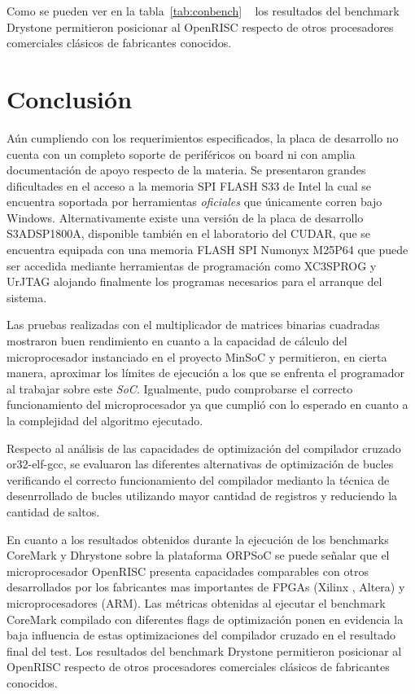 Como se pueden ver en la tabla~\ref{tab:conbench} ~\cite{compdhr} los resultados del benchmark Drystone permitieron posicionar al OpenRISC respecto de otros procesadores comerciales clásicos de fabricantes conocidos.

\section{Conclusión}
 Aún cumpliendo con los requerimientos especificados, la placa de desarrollo no cuenta con un completo soporte de periféricos on board ni con amplia
 documentación de apoyo respecto de la materia. Se presentaron grandes dificultades en el acceso a la memoria SPI FLASH S33 de Intel la cual se
 encuentra soportada por herramientas \textit{oficiales} que únicamente corren bajo Windows. Alternativamente existe una versión de la placa de
 desarrollo S3ADSP1800A, disponible también en el laboratorio del CUDAR, que se encuentra equipada con una memoria FLASH SPI Numonyx M25P64 que puede
 ser accedida mediante herramientas de programación como XC3SPROG y UrJTAG alojando finalmente los programas necesarios para el arranque del sistema.

Las pruebas realizadas con el multiplicador de matrices binarias cuadradas mostraron buen rendimiento en cuanto a la capacidad de cálculo del
microprocesador instanciado en el proyecto MinSoC y permitieron, en cierta manera, aproximar los límites de ejecución a los que se enfrenta el
programador al trabajar sobre este \textit{SoC}. Igualmente, pudo comprobarse el correcto funcionamiento del microprocesador ya que cumplió con lo
esperado en cuanto a la complejidad del algoritmo ejecutado.

Respecto al análisis de las capacidades de optimización del compilador cruzado or32-elf-gcc, se evaluaron las diferentes alternativas de
optimización de bucles verificando el correcto funcionamiento del compilador medianto la técnica de desenrrollado de bucles utilizando mayor cantidad
de registros y reduciendo la cantidad de saltos.
	
En cuanto a los resultados obtenidos durante la ejecución de los benchmarks CoreMark y Dhrystone sobre la plataforma ORPSoC se puede
señalar que el microprocesador OpenRISC presenta capacidades comparables con otros desarrollados por los fabricantes mas importantes de
FPGAs (Xilinx , Altera) y microprocesadores (ARM). Las métricas obtenidas al ejecutar el benchmark CoreMark compilado con diferentes flags de
optimización ponen en evidencia la baja influencia de estas optimizaciones del compilador cruzado en el resultado final del test. Los resultados del
benchmark Drystone permitieron posicionar al OpenRISC respecto de otros procesadores comerciales clásicos de fabricantes conocidos.
	
